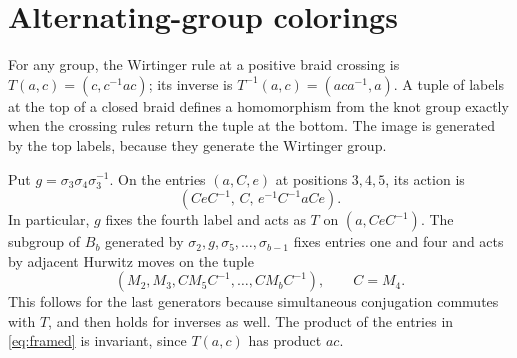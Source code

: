 \section{Alternating-group colorings}\label{sec:color}

For any group, the Wirtinger rule at a positive braid crossing is
\(T(a,c)=(c,c^{-1}ac)\); its inverse is
\(T^{-1}(a,c)=(aca^{-1},a)\). A tuple of labels at the top of a closed
braid defines a homomorphism from the knot group exactly when the
crossing rules return the tuple at the bottom. The image is generated
by the top labels, because they generate the Wirtinger group.

Put \(g=\sigma_3\sigma_4\sigma_3^{-1}\).
On the entries \((a,C,e)\) at positions \(3,4,5\), its action is
\[
                 (CeC^{-1},\,C,\,e^{-1}C^{-1}aCe).
\]
In particular, \(g\) fixes the fourth label and acts as \(T\) on
\((a,CeC^{-1})\). The subgroup of \(B_b\) generated by
\(\sigma_2,g,\sigma_5,\ldots,\sigma_{b-1}\) fixes entries one and
four and acts by adjacent Hurwitz moves on the tuple
\begin{equation}\label{eq:framed}
                  (M_2,M_3,CM_5C^{-1},\ldots,CM_bC^{-1}),
                  \qquad C=M_4.
\end{equation}
This follows for the last generators because simultaneous conjugation
commutes with \(T\), and then holds for inverses as well. The product of
the entries in \eqref{eq:framed} is invariant, since \(T(a,c)\) has
product \(ac\).

